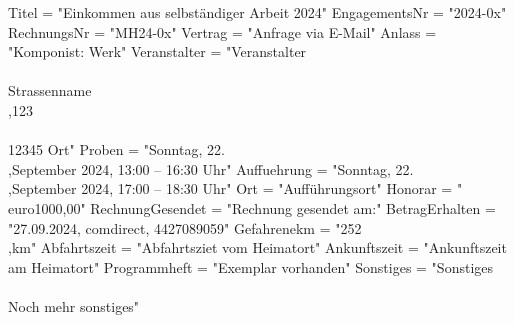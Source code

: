 \documentclass[11pt,a4paper,DIV=10]{scrartcl}
\begin{document}
\begin{luacode}
    Titel = "Einkommen aus selbständiger Arbeit 2024"
    EngagementsNr = "2024-0x"
    RechnungsNr = "MH24-0x"
    Vertrag = "Anfrage via E-Mail"
    Anlass = "Komponist: Werk"
    Veranstalter = "Veranstalter\\\\Strassenname\\,123\\\\12345 Ort"
    Proben = "Sonntag, 22.\\,September 2024, 13:00 -- 16:30 Uhr"
    Auffuehrung = "Sonntag, 22.\\,September 2024, 17:00 -- 18:30 Uhr"
    Ort = "Aufführungsort"
    Honorar = "\\euro{1000,00}"
    RechnungGesendet = "Rechnung gesendet am:"
    BetragErhalten = "27.09.2024, comdirect, 4427089059"
    Gefahrenekm = "252\\,km"
    Abfahrtszeit = "Abfahrtsziet vom Heimatort"
    Ankunftszeit = "Ankunftszeit am Heimatort"
    Programmheft = "Exemplar vorhanden"
    Sonstiges = "Sonstiges\\\\Noch mehr sonstiges"
\end{luacode}


\textbf{\Large{}}\\[20pt]
\end{document}
